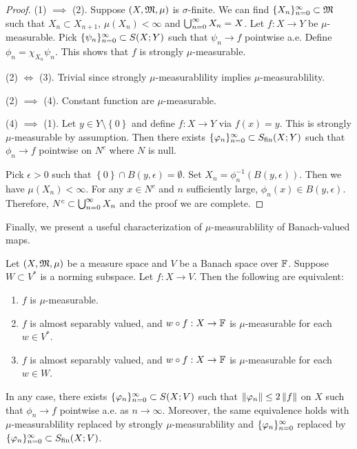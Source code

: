 \documentclass[a4paper]{article}
\begin{document}
\begin{proof}
  (1) $\implies$ (2). Suppose $(X, \mathfrak{M}, \mu)$ is 
  $\sigma$-finite. We can find $\{ X_n \}_{n=0}^\infty 
  \subset \mathfrak{M}$ such that $X_n \subset X_{n+1}$, 
  $\mu(X_n) < \infty$ and $\bigcup_{n=0}^\infty X_n = X$. 
  Let $f: X \to Y$ be $\mu$-measurable. Pick 
  $\{ \psi_n \}_{n=0}^\infty \subset S(X; Y)$ such that
  $\psi_n \to f$ pointwise a.e. Define 
  $\phi_n = \chi_{X_n} \psi_n$. This shows that 
  $f$ is strongly $\mu$-measurable.

  (2) $\iff$ (3). Trivial since strongly $\mu$-measurablility
  implies $\mu$-measurablility.

  (2) $\implies$ (4). Constant function are $\mu$-measurable.

  (4) $\implies$ (1). Let $y \in Y \setminus \left\{ 0 \right\}$
  and define $f : X \to Y$ via $f(x) = y$. This 
  is strongly $\mu$-measurable by assumption. 
  Then there exists $\{ \varphi_n \}_{n=0}^\infty \subset S_{\text{fin}}(X; Y)$ 
  such that $\phi_n \to f$ pointwise on $N^c$ where 
  $N$ is null. 

  Pick $\epsilon > 0$ such that $\left\{ 0 \right\} 
  \cap B(y, \epsilon) = \emptyset$. Set 
  $X_n = \phi_n^{-1} (B(y, \epsilon))$. Then we have 
  $\mu(X_n) < \infty$. For any $x \in N^c$ and $n$ 
  sufficiently large, $\phi_n(x) \in B(y, \epsilon)$.
  Therefore, $N^c \subset \bigcup_{n=0}^\infty X_n$ and 
  the proof we are complete.

\end{proof}

Finally, we present a useful characterization of 
$\mu$-measurablility of Banach-valued maps. 

\begin{thm}[Pettis]
  Let $(X, \mathfrak{M}, \mu)$ be a measure space and $V$ be a 
  Banach space over $\mathbb{F}$. Suppose $W \subset V^*$ is a 
  norming subspace. Let $f: X \to V$. Then the following
  are equivalent:
  \begin{enumerate}
    \item $f$ is $\mu$-measurable.
    \item $f$ is almost separably valued, and $w \circ
    f : X \to \mathbb{F}$ is $\mu$-measurable for each $w \in V^*$.
    \item $f$ is almost separably valued, and $w \circ f: 
    X \to \mathbb{F}$ is $\mu$-measurable for each $w \in W$.
  \end{enumerate}
  In any case, there exists $\{ \varphi_n \}_{n=0}^\infty \subset S(X; V)
  $ such that $\left\lVert \varphi_n\right\rVert \leq 2 \left\lVert f\right\rVert$ on $X$ such that 
  $\phi_n \to f$ pointwise a.e. as $n \to \infty$. 
  Moreover, the same 
  equivalence holds with $\mu$-measurablility replaced by 
  strongly $\mu$-measurablility and $\{ \varphi_n \}_{n=0}^\infty$  
  replaced by $\{ \varphi_n \}_{n=0}^\infty \subset S_{\text{fin}}(X; V)$.
\end{thm}
\end{document}
